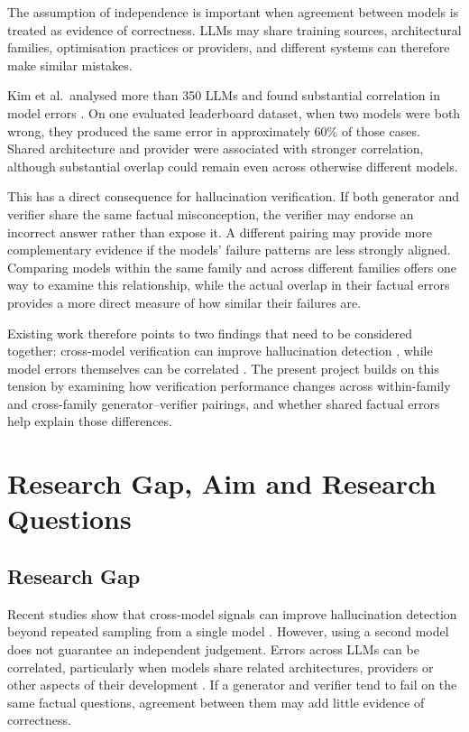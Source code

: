 \documentclass[11pt,a4paper]{article}
\begin{document}
	The assumption of independence is important when agreement between models is treated as evidence of correctness. LLMs may share training sources, architectural families, optimisation practices or providers, and different systems can therefore make similar mistakes.
	
	Kim et al.\ analysed more than 350 LLMs and found substantial correlation in model errors \cite{kim2025correlated}. On one evaluated leaderboard dataset, when two models were both wrong, they produced the same error in approximately 60\% of those cases. Shared architecture and provider were associated with stronger correlation, although substantial overlap could remain even across otherwise different models.
	
	This has a direct consequence for hallucination verification. If both generator and verifier share the same factual misconception, the verifier may endorse an incorrect answer rather than expose it. A different pairing may provide more complementary evidence if the models' failure patterns are less strongly aligned. Comparing models within the same family and across different families offers one way to examine this relationship, while the actual overlap in their factual errors provides a more direct measure of how similar their failures are.
	
	Existing work therefore points to two findings that need to be considered together: cross-model verification can improve hallucination detection \cite{xue2025verify,goel2025zero}, while model errors themselves can be correlated \cite{kim2025correlated}. The present project builds on this tension by examining how verification performance changes across within-family and cross-family generator--verifier pairings, and whether shared factual errors help explain those differences.
	
	\section{Research Gap, Aim and Research Questions}
	
	\subsection{Research Gap}
	
	Recent studies show that cross-model signals can improve hallucination detection beyond repeated sampling from a single model \cite{xue2025verify,goel2025zero}. However, using a second model does not guarantee an independent judgement. Errors across LLMs can be correlated, particularly when models share related architectures, providers or other aspects of their development \cite{kim2025correlated}. If a generator and verifier tend to fail on the same factual questions, agreement between them may add little evidence of correctness.
	
\end{document}
